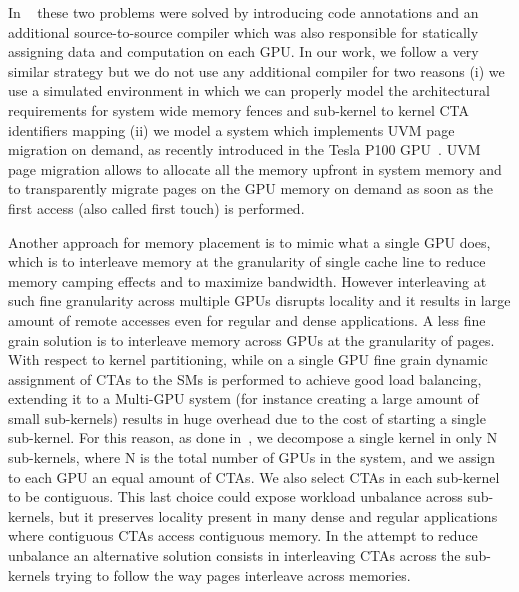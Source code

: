 In ~\cite{Cabezas2015} these two problems were solved by introducing  
code annotations and an additional source-to-source compiler which was also 
responsible for statically assigning data and computation on each GPU. In our 
work, we follow a very similar strategy but we do not use any additional 
compiler for two reasons (i) we use a simulated environment in which 
we can properly model the architectural requirements for system wide memory 
fences and sub-kernel to kernel CTA identifiers mapping (ii) we model a system 
which implements UVM page migration on demand, as recently introduced in the 
Tesla P100 GPU~\cite{P100}. UVM page migration allows to allocate 
all the memory upfront in system memory and to transparently migrate pages 
on the GPU memory on demand as soon as the first access (also called first 
touch) is performed.

Another approach for memory placement is to mimic what a single GPU does, 
which is to interleave memory at the granularity of single cache line to 
reduce memory camping effects and to maximize bandwidth. However interleaving 
at such fine granularity across multiple GPUs disrupts locality and it 
results in large amount of remote accesses even for regular and dense 
applications. A less fine grain solution is to interleave memory across GPUs 
at the granularity of pages. With respect to kernel partitioning, while on a 
single GPU fine grain dynamic assignment of CTAs to the SMs is performed to 
achieve good load balancing, extending it to a Multi-GPU system (for instance 
creating a large amount of small sub-kernels) results in huge overhead due to 
the cost of starting a single sub-kernel. For this reason, as done 
in~\cite{Cabezas2015}, we decompose a single kernel in only N sub-kernels, 
where N is the total number of GPUs in the system, and we assign to each GPU 
an equal amount of CTAs. We also select CTAs in each sub-kernel to be 
contiguous. This last choice could expose workload unbalance across 
sub-kernels, but it preserves locality present in many dense and regular 
applications where contiguous CTAs access contiguous memory. In the attempt 
to reduce unbalance an alternative solution consists in interleaving CTAs 
across the sub-kernels trying to follow the way pages interleave across 
memories. 

